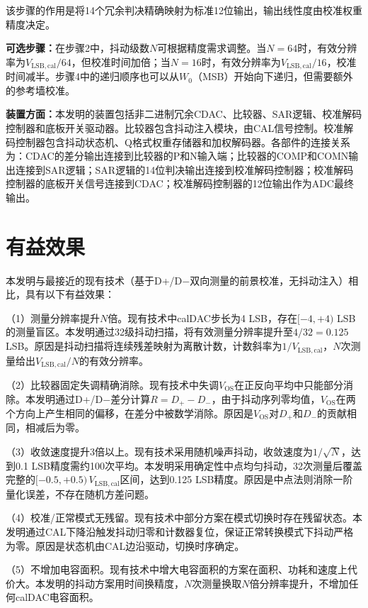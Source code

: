 \documentclass[UTF8,a4paper,11pt]{ctexart}
\begin{document}
该步骤的作用是将14个冗余判决精确映射为标准12位输出，输出线性度由校准权重精度决定。

\textbf{可选步骤：}在步骤2中，抖动级数$N$可根据精度需求调整。当$N=64$时，有效分辨率为$V_{\mathrm{LSB,cal}}/64$，但校准时间加倍；当$N=16$时，有效分辨率为$V_{\mathrm{LSB,cal}}/16$，校准时间减半。步骤4中的递归顺序也可以从$W_0$（MSB）开始向下递归，但需要额外的参考墙校准。

\textbf{装置方面：}本发明的装置包括非二进制冗余CDAC、比较器、SAR逻辑、校准解码控制器和底板开关驱动器。比较器包含抖动注入模块，由CAL信号控制。校准解码控制器包含抖动状态机、Q格式权重存储器和加权解码器。各部件的连接关系为：CDAC的差分输出连接到比较器的P和N输入端；比较器的COMP和COMN输出连接到SAR逻辑；SAR逻辑的14位判决输出连接到校准解码控制器；校准解码控制器的底板开关信号连接到CDAC；校准解码控制器的12位输出作为ADC最终输出。

\section{有益效果}

本发明与最接近的现有技术（基于D+/D$-$双向测量的前景校准，无抖动注入）相比，具有以下有益效果：

（1）测量分辨率提升$N$倍。现有技术中calDAC步长为4 LSB，存在$[-4, +4)$ LSB的测量盲区。本发明通过32级抖动扫描，将有效测量分辨率提升至$4/32 = 0.125$ LSB。原因是抖动扫描将连续残差映射为离散计数，计数斜率为$1/V_{\mathrm{LSB,cal}}$，$N$次测量给出$V_{\mathrm{LSB,cal}}/N$的有效分辨率。

（2）比较器固定失调精确消除。现有技术中失调$V_{\mathrm{OS}}$在正反向平均中只能部分消除。本发明通过D+/D$-$差分计算$R = D_+ - D_-$，由于抖动序列零均值，$V_{\mathrm{OS}}$在两个方向上产生相同的偏移，在差分中被数学消除。原因是$V_{\mathrm{OS}}$对$D_+$和$D_-$的贡献相同，相减后为零。

（3）收敛速度提升3倍以上。现有技术采用随机噪声抖动，收敛速度为$1/\sqrt{N}$，达到0.1 LSB精度需约100次平均。本发明采用确定性中点均匀抖动，32次测量后覆盖完整的$[-0.5, +0.5)\,V_{\mathrm{LSB,cal}}$区间，达到0.125 LSB精度。原因是中点法则消除一阶量化误差，不存在随机方差问题。

（4）校准/正常模式无残留。现有技术中部分方案在模式切换时存在残留状态。本发明通过CAL下降沿触发抖动归零和计数器复位，保证正常转换模式下抖动严格为零。原因是状态机由CAL边沿驱动，切换时序确定。

（5）不增加电容面积。现有技术中增大电容面积的方案在面积、功耗和速度上代价大。本发明的抖动方案用时间换精度，$N$次测量换取$N$倍分辨率提升，不增加任何calDAC电容面积。
\end{document}
